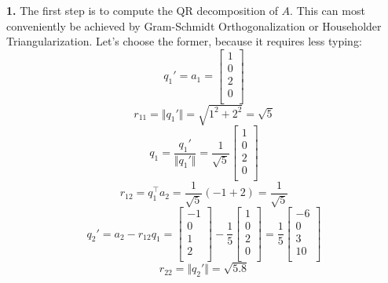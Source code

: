 \documentclass[a4paper, 11pt]{article}
\begin{document}
\textbf{1.} The first step is to compute the QR decomposition of $A$. This can
most conveniently be achieved by Gram-Schmidt Orthogonalization or Householder
Triangularization. Let's choose the former, because it requires less typing:
\begin{equation*}
  q_1' = a_1 =
  \begin{bmatrix}
  1  \\
  0 \\
  2 \\
  0 \\
  \end{bmatrix}
\end{equation*}
\begin{equation*}
  r_{1 1} = \Vert q_1'\Vert = \sqrt{1^2 + 2^2} = \sqrt{5}
\end{equation*}
\begin{equation*}
  q_1 = \frac{q_1'}{\Vert q_1'\Vert} = \frac{1}{\sqrt{5}}
  \begin{bmatrix}
  1  \\
  0 \\
  2 \\
  0 \\
  \end{bmatrix}
\end{equation*}
\begin{equation*}
  r_{1 2} = q_1^{\top}a_2 = \frac{1}{\sqrt{5}}(-1 + 2) = \frac{1}{\sqrt{5}}
\end{equation*}
\begin{equation*}
  q_2' = a_2 - r_{1 2}q_1 =
  \begin{bmatrix}
  -1  \\
  0 \\
  1 \\
  2 \\
  \end{bmatrix}
  - \frac{1}{5}
  \begin{bmatrix}
  1  \\
  0 \\
  2 \\
  0 \\
  \end{bmatrix}
  =
  \frac{1}{5}
  \begin{bmatrix}
  -6  \\
  0 \\
  3 \\
  10 \\
  \end{bmatrix}
\end{equation*}
\begin{equation*}
  r_{2 2} = \Vert q_2' \Vert = \sqrt{5.8}
\end{equation*}
\end{document}
